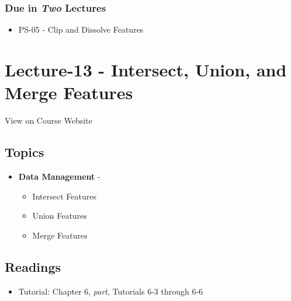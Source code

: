 \documentclass[
]{book}
\providecommand{\tightlist}{%
  \setlength{\itemsep}{0pt}\setlength{\parskip}{0pt}}
\begin{document}
\hypertarget{due-in-two-lectures-6}{%
\subsubsection*{\texorpdfstring{Due in \emph{Two} Lectures}{Due in Two Lectures}}\label{due-in-two-lectures-6}}

\begin{itemize}
\tightlist
\item
  PS-05 - Clip and Dissolve Features
\end{itemize}

\hypertarget{lecture-13---intersect-union-and-merge-features}{%
\section*{Lecture-13 - Intersect, Union, and Merge Features}\label{lecture-13---intersect-union-and-merge-features}}

View on Course Website

\hypertarget{topics-13}{%
\subsection*{Topics}\label{topics-13}}

\begin{itemize}
\tightlist
\item
  \textbf{Data Management} -

  \begin{itemize}
  \tightlist
  \item
    Intersect Features
  \item
    Union Features
  \item
    Merge Features
  \end{itemize}
\end{itemize}

\hypertarget{readings-13}{%
\subsection*{Readings}\label{readings-13}}

\begin{itemize}
\tightlist
\item
  Tutorial: Chapter 6, \emph{part}, Tutorials 6-3 through 6-6
\end{itemize}
\end{document}
